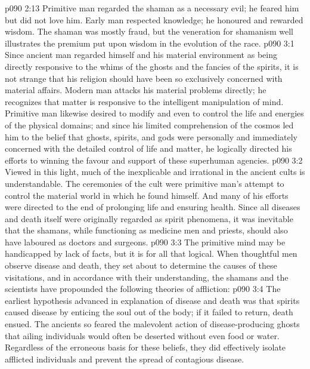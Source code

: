 \vs p090 2:13 Primitive man regarded the shaman as a necessary evil; he feared him but did not love him. Early man respected knowledge; he honoured and rewarded wisdom. The shaman was mostly fraud, but the veneration for shamanism well illustrates the premium put upon wisdom in the evolution of the race.
\vs p090 3:1 Since ancient man regarded himself and his material environment as being directly responsive to the whims of the ghosts and the fancies of the spirits, it is not strange that his religion should have been so exclusively concerned with material affairs. Modern man attacks his material problems directly; he recognizes that matter is responsive to the intelligent manipulation of mind. Primitive man likewise desired to modify and even to control the life and energies of the physical domains; and since his limited comprehension of the cosmos led him to the belief that ghosts, spirits, and gods were personally and immediately concerned with the detailed control of life and matter, he logically directed his efforts to winning the favour and support of these superhuman agencies.
\vs p090 3:2 Viewed in this light, much of the inexplicable and irrational in the ancient cults is understandable. The ceremonies of the cult were primitive man’s attempt to control the material world in which he found himself. And many of his efforts were directed to the end of prolonging life and ensuring health. Since all diseases and death itself were originally regarded as spirit phenomena, it was inevitable that the shamans, while functioning as medicine men and priests, should also have laboured as doctors and surgeons.
\vs p090 3:3 The primitive mind may be handicapped by lack of facts, but it is for all that logical. When thoughtful men observe disease and death, they set about to determine the causes of these visitations, and in accordance with their understanding, the shamans and the scientists have propounded the following theories of affliction:
\vs p090 3:4 \bibnobreakspace {} The earliest hypothesis advanced in explanation of disease and death was that spirits caused disease by enticing the soul out of the body; if it failed to return, death ensued. The ancients so feared the malevolent action of disease\hyp{}producing ghosts that ailing individuals would often be deserted without even food or water. Regardless of the erroneous basis for these beliefs, they did effectively isolate afflicted individuals and prevent the spread of contagious disease.
